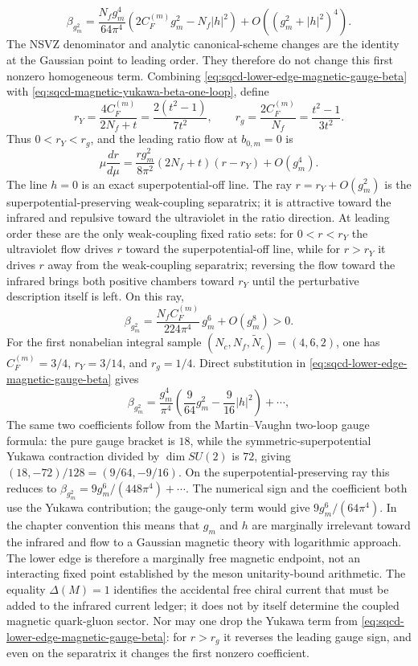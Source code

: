 \begin{equation}
  \beta_{g_m^2}
  =
  \frac{N_f g_m^4}{64\pi^4}
  \left(2C_F^{(m)}g_m^2-N_f|h|^2\right)
  +O\!\left((g_m^2+|h|^2)^4\right).
  \label{eq:sqcd-lower-edge-magnetic-gauge-beta}
\end{equation}
The NSVZ denominator and analytic canonical-scheme changes are the identity
at the Gaussian point to leading order.  They therefore do not change this
first nonzero homogeneous term.  Combining
\eqref{eq:sqcd-lower-edge-magnetic-gauge-beta} with
\eqref{eq:sqcd-magnetic-yukawa-beta-one-loop}, define
\[
  r_Y
  =
  \frac{4C_F^{(m)}}{2N_f+t}
  =
  \frac{2(t^2-1)}{7t^2},
  \qquad
  r_g
  =
  \frac{2C_F^{(m)}}{N_f}
  =
  \frac{t^2-1}{3t^2}.
\]
Thus \(0<r_Y<r_g\), and the leading ratio flow at \(b_{0,m}=0\) is
\[
  \mu\frac{dr}{d\mu}
  =
  \frac{r g_m^2}{8\pi^2}(2N_f+t)(r-r_Y)
  +O(g_m^4).
\]
The line \(h=0\) is an exact superpotential-off line.  The ray
\(r=r_Y+O(g_m^2)\) is the superpotential-preserving weak-coupling separatrix;
it is attractive toward the infrared and repulsive toward the ultraviolet in
the ratio direction.  At leading order these are the only weak-coupling fixed
ratio sets: for \(0<r<r_Y\) the ultraviolet flow drives \(r\) toward the
superpotential-off line, while for \(r>r_Y\) it drives \(r\) away from the
weak-coupling separatrix; reversing the flow toward the infrared brings both
positive chambers toward \(r_Y\) until the perturbative description itself is
left.  On this ray,
\begin{equation}
  \beta_{g_m^2}
  =
  \frac{N_f C_F^{(m)}}{224\pi^4}\,g_m^6
  +O(g_m^8)
  >
  0 .
  \label{eq:sqcd-lower-edge-magnetic-ray-beta}
\end{equation}
For the first nonabelian integral sample
\((N_c,N_f,\widetilde N_c)=(4,6,2)\), one has
\(C_F^{(m)}=3/4\), \(r_Y=3/14\), and \(r_g=1/4\).  Direct substitution in
\eqref{eq:sqcd-lower-edge-magnetic-gauge-beta} gives
\[
  \beta_{g_m^2}
  =
  \frac{g_m^4}{\pi^4}
  \left(\frac{9}{64}g_m^2-\frac{9}{16}|h|^2\right)+\cdots ,
\]
The same two coefficients follow from the Martin--Vaughn two-loop gauge
formula: the pure gauge bracket is \(18\), while the symmetric-superpotential
Yukawa contraction divided by \(\dim SU(2)\) is \(72\), giving
\((18,-72)/128=(9/64,-9/16)\).  On the
superpotential-preserving ray this reduces to
\(\beta_{g_m^2}=9g_m^6/(448\pi^4)+\cdots\).  The numerical sign and the
coefficient both use the Yukawa contribution; the gauge-only term would give
\(9g_m^6/(64\pi^4)\).
In the chapter convention this means that \(g_m\) and \(h\) are marginally
irrelevant toward the infrared and flow to a Gaussian magnetic theory with
logarithmic approach.  The lower edge is therefore a marginally free magnetic
endpoint, not an interacting fixed point established by the meson
unitarity-bound arithmetic.  The equality \(\Delta(M)=1\) identifies the
accidental free chiral current that must be added to the infrared current
ledger; it does not by itself determine the coupled magnetic quark-gluon
sector.  Nor may one drop the Yukawa term from
\eqref{eq:sqcd-lower-edge-magnetic-gauge-beta}: for \(r>r_g\) it reverses the
leading gauge sign, and even on the separatrix it changes the first nonzero
coefficient.

